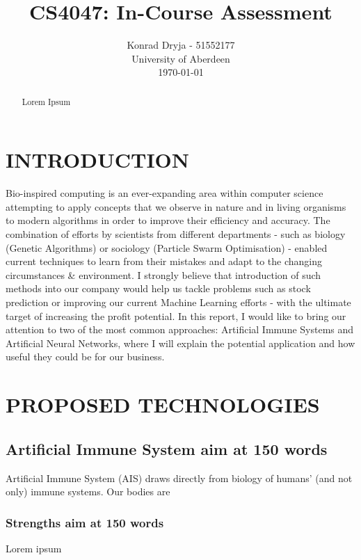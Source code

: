 \documentclass[letterpaper, 10 pt, conference]{ieeeconf}  %
\title{\LARGE \bf
CS4047: In-Course Assessment
}
\author{Konrad Dryja - 51552177 \\
  University of Aberdeen \\
  \today%
}
\begin{document}
\maketitle
\thispagestyle{empty}
\pagestyle{empty}


\begin{abstract}

Lorem Ipsum

\end{abstract}


\section{INTRODUCTION}

Bio-inspired computing is an ever-expanding area within computer science attempting to apply concepts that we observe in nature and in living organisms to modern algorithms in order to improve their efficiency and accuracy. The combination of efforts by scientists from different departments - such as biology (Genetic Algorithms) or sociology (Particle Swarm Optimisation) - enabled current techniques to learn from their mistakes and adapt to the changing circumstances \& environment. I strongly believe that introduction of such methods into our company would help us tackle problems such as stock prediction \cite{gunasekaran2011evaluation} or improving our current Machine Learning efforts - with the ultimate target of increasing the profit potential. In this report, I would like to bring our attention to two of the most common approaches: Artificial Immune Systems and Artificial Neural Networks, where I will explain the potential application and how useful they could be for our business.

\section{PROPOSED TECHNOLOGIES}

\subsection{Artificial Immune System aim at 150 words}
Artificial Immune System (AIS) draws directly from biology of humans' (and not only) immune systems. Our bodies are 

\subsubsection{Strengths aim at 150 words} 
Lorem ipsum
\end{document}
